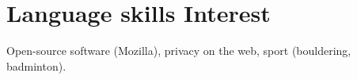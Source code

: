 \documentclass[11pt,a4paper]{moderncv}
\begin{document}
\section{Language skills \hspace{4.75cm} Interest \hfill}
\begin{minipage}{0.5\textwidth}
\end{minipage}
\hspace*{0.06\textwidth}
\begin{minipage}{0.4\textwidth}
\vspace*{-0.17cm}
Open-source software (Mozilla), privacy on the web, sport (bouldering, badminton).
\end{minipage}
\end{document}
